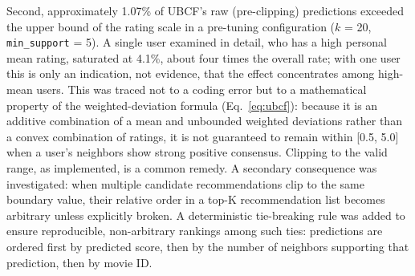 \documentclass[conference]{IEEEtran}
\begin{document}
Second, approximately 1.07\% of UBCF's raw (pre-clipping) predictions exceeded the upper bound of the rating scale in a pre-tuning configuration ($k$ = 20, \texttt{min\_support} = 5). A single user examined in detail, who has a high personal mean rating, saturated at 4.1\%, about four times the overall rate; with one user this is only an indication, not evidence, that the effect concentrates among high-mean users. This was traced not to a coding error but to a mathematical property of the weighted-deviation formula (Eq.~\eqref{eq:ubcf}): because it is an additive combination of a mean and unbounded weighted deviations rather than a convex combination of ratings, it is not guaranteed to remain within [0.5, 5.0] when a user's neighbors show strong positive consensus. Clipping to the valid range, as implemented, is a common remedy. A secondary consequence was investigated: when multiple candidate recommendations clip to the same boundary value, their relative order in a top-K recommendation list becomes arbitrary unless explicitly broken. A deterministic tie-breaking rule was added to ensure reproducible, non-arbitrary rankings among such ties: predictions are ordered first by predicted score, then by the number of neighbors supporting that prediction, then by movie ID.
\end{document}
